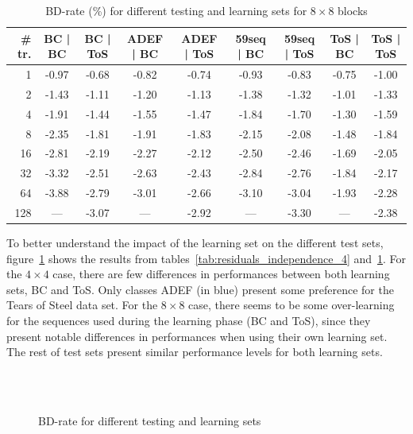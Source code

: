 \documentclass[11pt,a4paper,openright,twoside]{book}
\numberwithin{equation}{section} %
\numberwithin{figure}{section} %
\numberwithin{table}{section} %
\begin{document}
\begin{table}[tb]
	\centering
	\small
	\begin{tabularx}{\linewidth}{r|cc|cc|cc|cc}
		\# tr. & BC | BC & BC | ToS & ADEF | BC & ADEF | ToS & 59seq | BC &
		59seq | ToS & ToS | BC & ToS | ToS \\
		\hline\hline
		1   & -0.97 & -0.68 & -0.82 & -0.74 & -0.93 & -0.83 & -0.75 & -1.00 \\
		2   & -1.43 & -1.11 & -1.20 & -1.13 & -1.38 & -1.32 & -1.01 & -1.33 \\
		4   & -1.91 & -1.44 & -1.55 & -1.47 & -1.84 & -1.70 & -1.30 & -1.59 \\
		8   & -2.35 & -1.81 & -1.91 & -1.83 & -2.15 & -2.08 & -1.48 & -1.84 \\
		16  & -2.81 & -2.19 & -2.27 & -2.12 & -2.50 & -2.46 & -1.69 & -2.05 \\
		32  & -3.32 & -2.51 & -2.63 & -2.43 & -2.84 & -2.76 & -1.84 & -2.17 \\
		64  & -3.88 & -2.79 & -3.01 & -2.66 & -3.10 & -3.04 & -1.93 & -2.28 \\
		128 & ---   & -3.07 & ---   & -2.92 & ---   & -3.30 & ---   & -2.38 \\
	\end{tabularx}
	\caption{\acs{BD}-rate (\%) for different testing and learning sets for
	$8\times8$ blocks}
	\label{tab:residuals_independence_8}
\end{table}

To better understand the impact of the learning set on the different test
sets, figure~\ref{fig:residuals_independence} shows the results from
tables~\ref{tab:residuals_independence_4}
and~\ref{tab:residuals_independence_8}.
For the $4\times4$ case, there are few differences in performances between
both learning sets, BC and ToS.
Only classes ADEF (in blue) present some preference for the Tears of
Steel data set.
For the $8\times8$ case, there seems to be some over-learning for the
sequences used during the learning phase (BC and ToS), since they present
notable differences in performances when using their own learning set.
The rest of test sets present similar performance levels for both learning
sets.

\begin{figure}[tb]
	\centering
	\\
	\\
	\caption{\acs{BD}-rate for different testing and learning sets}
	\label{fig:residuals_independence}
\end{figure}
\end{document}
